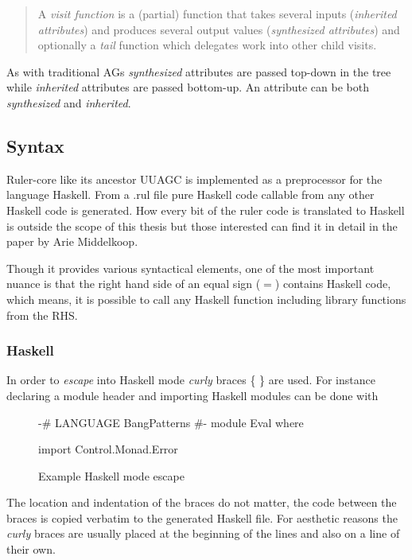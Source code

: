 \begin{quotation}
A \emph{visit function}\cite{visitag} is a (partial) function that takes several inputs (\emph{inherited attributes}) and produces several output values (\emph{synthesized attributes}) and optionally a \emph{tail} function which delegates work into other child visits.
\end{quotation}

As with traditional AGs \emph{synthesized} attributes are passed top-down in the tree while \emph{inherited} attributes are passed bottom-up. An attribute can be both \emph{synthesized} and \emph{inherited}.

\subsection{Syntax}
Ruler-core like its ancestor UUAGC is implemented as a preprocessor for the language Haskell. From a .rul file pure Haskell code callable from any other Haskell code is generated. How every bit of the ruler code is translated to Haskell is outside the scope of this thesis but those interested can find it in detail in the paper by Arie Middelkoop\cite{visitag}.

Though it provides various syntactical elements, one of the most important nuance is that the right hand side of an equal sign ($=$) contains Haskell code, which means, it is possible to call any Haskell function including library functions from the RHS. 

\subsubsection{Haskell}
In order to \emph{escape} into Haskell mode \emph{curly} braces \{ \} are used. For instance declaring a module header and importing Haskell modules can be done with

\begin{figure}[!h]
\begin{code}
{
{-# LANGUAGE BangPatterns #-}
module Eval where

import Control.Monad.Error
}
\end{code}
\caption{Example Haskell mode escape}
\end{figure}

The location and indentation of the braces do not matter, the code between the braces is copied verbatim to the generated Haskell file. For aesthetic reasons the \emph{curly} braces are usually placed at the beginning of the lines and also on a line of their own. 

